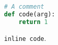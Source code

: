 \documentclass{article}
\begin{document}
\begin{lstlisting}[language=python,caption=THis is a caption.]
# A comment
def code(arg):
    return 1
\end{lstlisting}

\lstinline[columns=fixed]$inline code$.
\end{document}
